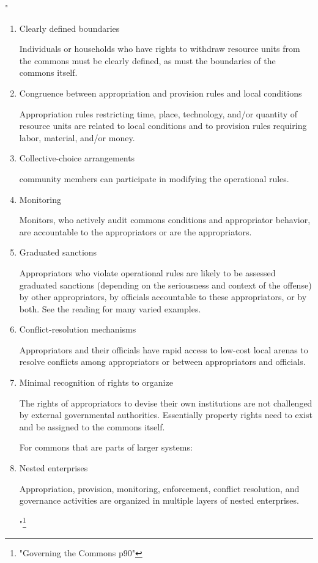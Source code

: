 "
\begin{enumerate}
	
	\item {Clearly defined boundaries}
	
	Individuals or households who have rights to withdraw resource units from the commons must be clearly defined, as must the boundaries of the commons itself.
	
	
	\item{ Congruence between appropriation and provision rules and local conditions}
	
	Appropriation rules restricting time, place, technology, and/or quantity of resource units are related to local conditions and to provision rules requiring labor, material, and/or money.
	
	
	\item{Collective-choice arrangements}
	
	community members can participate in modifying the operational rules.
	
	
	\item{Monitoring}
	
	Monitors, who actively audit commons conditions and appropriator behavior, are accountable to the appropriators or are the appropriators.
	
	
	\item{Graduated sanctions}
	
	Appropriators who violate operational rules are likely to be assessed graduated sanctions (depending on the seriousness and context of the offense) by other appropriators, by officials accountable to these appropriators, or by both. See the reading for many varied examples. 
	
	
	\item{Conflict-resolution mechanisms}
	
	Appropriators and their officials have rapid access to low-cost local arenas to resolve conflicts among appropriators or between appropriators and officials.
	
	
	
	\item{Minimal recognition of rights to organize}
	
	The rights of appropriators to devise their own institutions are not challenged by external governmental authorities. Essentially property rights need to exist and be assigned to the commons itself. 
	
	For commons that are parts of larger systems:
	
	\item{Nested enterprises}
	
	Appropriation, provision, monitoring, enforcement, conflict resolution, and governance activities are organized in multiple layers of nested enterprises.
	
	"\footnote{"Governing the Commons p90"}
	
\end{enumerate}
